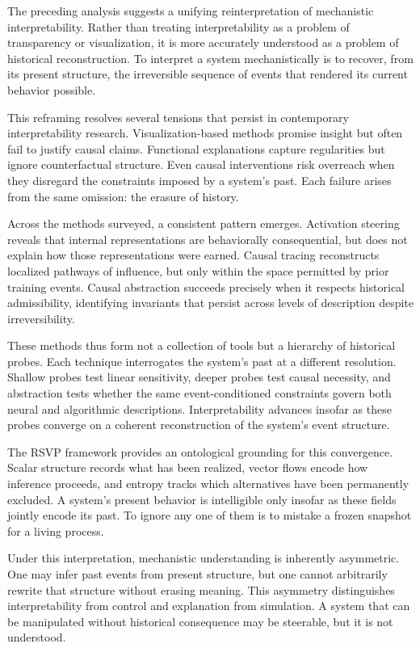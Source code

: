 \documentclass[11pt]{article}
\begin{document}
The preceding analysis suggests a unifying reinterpretation of mechanistic
interpretability. Rather than treating interpretability as a problem of
transparency or visualization, it is more accurately understood as a problem of
historical reconstruction. To interpret a system mechanistically is to recover,
from its present structure, the irreversible sequence of events that rendered
its current behavior possible.

This reframing resolves several tensions that persist in contemporary
interpretability research. Visualization-based methods promise insight but often
fail to justify causal claims. Functional explanations capture regularities but
ignore counterfactual structure. Even causal interventions risk overreach when
they disregard the constraints imposed by a system’s past. Each failure arises
from the same omission: the erasure of history.

Across the methods surveyed, a consistent pattern emerges. Activation steering
reveals that internal representations are behaviorally consequential, but does
not explain how those representations were earned. Causal tracing reconstructs
localized pathways of influence, but only within the space permitted by prior
training events. Causal abstraction succeeds precisely when it respects
historical admissibility, identifying invariants that persist across levels of
description despite irreversibility.

These methods thus form not a collection of tools but a hierarchy of historical
probes. Each technique interrogates the system’s past at a different resolution.
Shallow probes test linear sensitivity, deeper probes test causal necessity, and
abstraction tests whether the same event-conditioned constraints govern both
neural and algorithmic descriptions. Interpretability advances insofar as these
probes converge on a coherent reconstruction of the system’s event structure.

The RSVP framework provides an ontological grounding for this convergence.
Scalar structure records what has been realized, vector flows encode how
inference proceeds, and entropy tracks which alternatives have been permanently
excluded. A system’s present behavior is intelligible only insofar as these
fields jointly encode its past. To ignore any one of them is to mistake a frozen
snapshot for a living process.

Under this interpretation, mechanistic understanding is inherently asymmetric.
One may infer past events from present structure, but one cannot arbitrarily
rewrite that structure without erasing meaning. This asymmetry distinguishes
interpretability from control and explanation from simulation. A system that can
be manipulated without historical consequence may be steerable, but it is not
understood.
\end{document}
